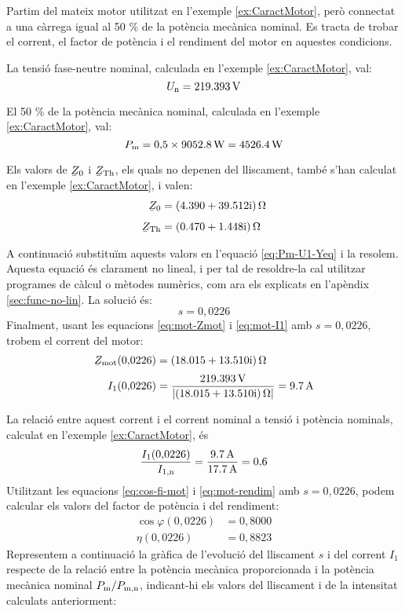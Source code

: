 \begin{exemple}\label{ex:MotCarregaReduida}
	\addcontentsxms{\MotCarregaReduida}
	Partim del mateix motor utilitzat en l'exemple \vref{ex:CaractMotor}, però connectat a una càrrega igual  al 50 \% de la potència mecànica nominal. Es tracta de trobar el corrent, el factor de potència i el rendiment del motor en aquestes condicions.

	La tensió  fase-neutre  nominal, calculada  en l'exemple \ref{ex:CaractMotor}, val: 
	\[
		U_\mathrm{n} = \qty{219,393}{V}
	\]
	
	El 50 \% de la potència mecànica nominal, calculada  en l'exemple \ref{ex:CaractMotor}, val:
	\[
		P_\mathrm{m} =  0{,}5\times\qty{9052,8}{W} = \qty{4526,4}{W}
	\]

	Els valors de $\cmplx{Z}_0$ i  $\cmplx{Z}\ped{Th}$, els quals no depenen del lliscament, també s'han calculat en  l'exemple \ref{ex:CaractMotor}, i valen:
	\begin{align*}
		\cmplx{Z}_0 &=  \complexqty{4,390+j39,512}{\ohm} \\[1ex]
		\cmplx{Z}\ped{Th} &= \complexqty{0,470+j1,448}{\ohm} 
	\end{align*}
	
	A continuació  substituïm aquests valors en l'equació \eqref{eq:Pm-U1-Yeq} i la resolem.  Aquesta equació és clarament no lineal, i per tal de resoldre-la cal utilitzar programes de càlcul o mètodes numèrics, com ara els explicats en l'apèndix \ref{sec:func-no-lin}. La solució és:
	\[
		s = 0{,}0226
	\]
	Finalment, usant les equacions \eqref{eq:mot-Zmot} i \eqref{eq:mot-I1} amb $s  = 0{,}0226$,  trobem el corrent del motor:
	\begin{align*}
	\cmplx{Z}\ped{mot}(0{,}0226) &=  \complexqty{18,015+j13,510}{\ohm} \\[0.5ex]
	I_1(0{,}0226) &= \frac{\qty{219,393}{V}}{|\complexqty{18,015+j13,510}{\ohm}|} = \qty{9,7}{A}
	\end{align*}
	
	La relació entre aquest  corrent i el corrent nominal a tensió i potència nominals, calculat en l'exemple \ref{ex:CaractMotor}, és
	\[
	\frac{I_1(0{,}0226)}{I_\mathrm{1,n}} = \frac{\qty{9,7}{A}}{\qty{17,7}{A}} = 0{,}6
	\]
	Utilitzant les equacions  \eqref{eq:cos-fi-mot} i \eqref{eq:mot-rendim} amb $s  = 0{,}0226$, podem calcular els valors del factor de potència i del rendiment:
	\begin{align*}
		\cos\varphi(0{,}0226) &=  0{,}8000 \\
		\eta(0{,}0226) &=  0{,}8823
	\end{align*}	
	Representem a continuació la gràfica de l'evolució del lliscament $s$ i del corrent $I_1$ respecte de la relació entre la potència mecànica proporcionada i la potència mecànica nominal $P_\mathrm{m}/P_\mathrm{m,n}$, indicant-hi els valors del lliscament i de la intensitat calculats anteriorment:
	\begin{center}
		
	\end{center}


\end{exemple}
